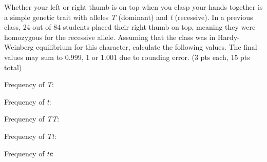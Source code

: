 
\question[15]
Whether your left or right thumb is on top when you clasp your hands together is a simple genetic trait with alleles \textit{T} (dominant) and \textit{t} (recessive).  In a previous class, 24 out of 84 students placed their right thumb on top, meaning they were homozygous for the recessive allele.  Assuming that the class was in Hardy-Weinberg equilibrium for this character, calculate the following values. The final values may sum to 0.999, 1 or 1.001 due to rounding error. (3 pts each, 15 pts total)

\vspace{2\baselineskip}
Frequency of \textit{T}:

\vspace{2\baselineskip}
Frequency of \textit{t}:

\vspace{2\baselineskip}
Frequency of \textit{TT}:

\vspace{2\baselineskip}
Frequency of \textit{Tt}:

\vspace{2\baselineskip}
Frequency of \textit{tt}: 


